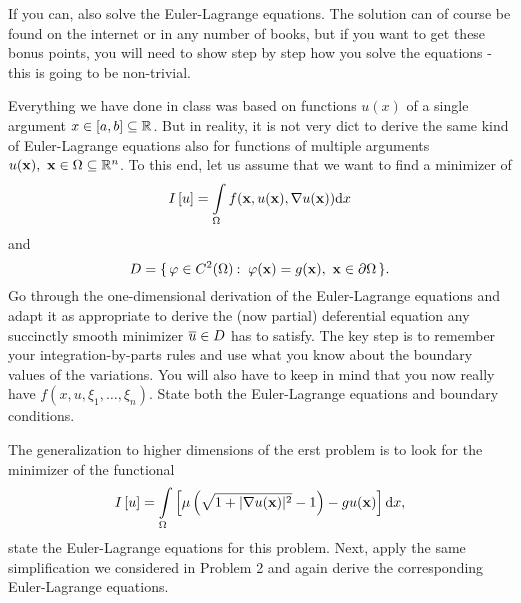 \documentclass[12pt]{memoir}
\begin{document}
\begin{nonum-Ej}
    If you can, also solve the Euler-Lagrange equations. The solution can of course be found on the internet
or in any number of books, but if you want to get these bonus points, you will need to show step by step
how you solve the equations - this is going to be non-trivial.
\end{nonum-Ej}

\begin{Ej}
    Everything we have done in class was based on functions $u(x)$ of a
single argument $x\in\left\lbrack a,b\right\rbrack\subseteq\mathbb{R}$. But in reality, it is not very dict to derive the same kind of Euler-Lagrange
equations also for functions of multiple arguments $u(\mathbf{x}),\ \mathbf{x}\in\Omega\subseteq\mathbb{R}^n$.
To this end, let us assume that we want to find a minimizer of
$$I\left\lbrack u\right\rbrack=\int\limits_\Omega f(\mathbf{x},u(\mathbf{x}),\nabla u(\mathbf{x}))\dd x$$
and
$$D=\{\,\varphi\in C^2(\Omega)\mathbin{:}\ \varphi(\mathbf{x})=g(\mathbf{x}),\ \mathbf{x}\in\partial\Omega\,\}.$$
Go through the one-dimensional derivation of the Euler-Lagrange equations and adapt it as appropriate to
derive the (now partial) deferential equation any succinctly smooth minimizer $\overline u\in D$ has to satisfy. The
key step is to remember your integration-by-parts rules and use what you know about the boundary values
of the variations. You will also have to keep in mind that you now really have $f(x, u,\xi_1,\dots,\xi_n)$.
State both the Euler-Lagrange equations and boundary conditions.
\end{Ej}

\begin{Ej}
    The generalization to higher dimensions of the erst problem is to
look for the minimizer of the functional
$$I\left\lbrack u\right\rbrack=\int\limits_\Omega\left\lbrack\mu\left(\sqrt{1+|\nabla u(\mathbf{x})|^2}-1\right)-gu(\mathbf{x})\right\rbrack\dd x,$$
state the Euler-Lagrange equations for this problem.
Next, apply the same simplification we considered in Problem 2 and again derive the corresponding
Euler-Lagrange equations.
\end{Ej}
\end{document}
